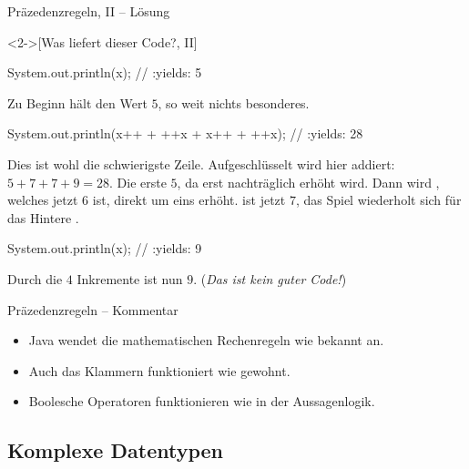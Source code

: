 \begin{frame}[fragile,c]{Präzedenzregeln, II -- Lösung}
    \begin{solve}<2->[Was liefert dieser Code?, II]
        \pause{}\begin{plainjava}[columns={[c]fullflexible}]
System.out.println(x); // :yields: 5
        \end{plainjava}
        \pause{}Zu Beginn hält  den Wert \(5\), so weit nichts besonderes.
        \begin{plainjava}[columns={[c]fullflexible}]
System.out.println(x++ + ++x + x++ + ++x); // :yields: 28
        \end{plainjava}
        \pause{}Dies ist wohl die schwierigste Zeile.\pause{} Aufgeschlüsselt wird hier addiert: \(5 + 7 + 7 + 9 = 28\).\pause{} Die erste \(5\), da  erst nachträglich erhöht wird.\pause{} Dann wird , welches jetzt \(6\) ist, direkt um eins erhöht.\pause{}  ist jetzt \(7\), das Spiel wiederholt sich für das Hintere .\pause{}
        \begin{plainjava}[columns={[c]fullflexible}]
System.out.println(x); // :yields: 9
        \end{plainjava}
        \pause{}Durch die \(4\) Inkremente ist  nun \(9\).\pause{} (\textit{Das ist \emph{kein} guter Code!})
    \end{solve}
\end{frame}
\fi

\begin{frame}{Präzedenzregeln -- Kommentar}
    \begin{itemize}[<+(1)->]
        \widei
        \item Java wendet die mathematischen Rechenregeln wie bekannt an.
        \item Auch das Klammern funktioniert wie gewohnt.
        \item Boolesche Operatoren funktionieren wie in der Aussagenlogik.
    \end{itemize}
\end{frame}

\subsection{Komplexe Datentypen}

